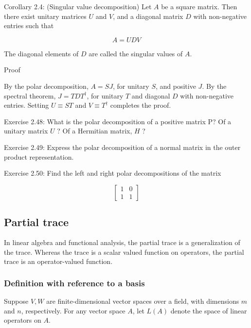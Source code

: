 \documentclass[
	11pt, %
	fleqn, %
	a4paper, %
]{LegrandOrangeBook}
\begin{document}
Corollary 2.4: (Singular value decomposition) Let $A$ be a square matrix. Then there exist unitary matrices $U$ and $V$, and a diagonal matrix $D$ with non-negative entries such that

$$
A=U D V
$$

The diagonal elements of $D$ are called the singular values of $A$.

Proof

By the polar decomposition, $A=S J$, for unitary $S$, and positive $J$. By the spectral theorem, $J=T D T^{\dagger}$, for unitary $T$ and diagonal $D$ with non-negative entries. Setting $U \equiv S T$ and $V \equiv T^{\dagger}$ completes the proof.

Exercise 2.48: What is the polar decomposition of a positive matrix P? Of a unitary matrix $U$ ? Of a Hermitian matrix, $H$ ?

Exercise 2.49: Express the polar decomposition of a normal matrix in the outer product representation.

Exercise 2.50: Find the left and right polar decompositions of the matrix

$$
\left[\begin{array}{ll}
1 & 0 \\
1 & 1
\end{array}\right]
$$


\subsection{Partial trace}


In linear algebra and functional analysis, the partial trace is a generalization of the trace. 
Whereas the trace is a scalar valued function on operators, the partial trace is an operator-valued function.

\subsubsection{Definition with reference to a basis}

Suppose $V, W$ are finite-dimensional vector spaces over a field, with dimensions $m$ and $n$, respectively. 
For any vector space $A$, let $L(A)$ denote the space of linear operators on $A$.
\end{document}
